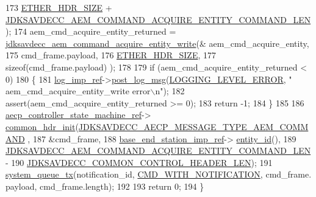 \begin{DoxyCode}
173                                                         \hyperlink{namespaceavdecc__lib_a6c827b1a0d973e18119c5e3da518e65ca9512ad9b34302ba7048d88197e0a2dc0}{ETHER\_HDR\_SIZE} + 
      \hyperlink{group__command__acquire__entity_gacd48c850101d4deef27e5c003f1c54cb}{JDKSAVDECC\_AEM\_COMMAND\_ACQUIRE\_ENTITY\_COMMAND\_LEN});
174     aem\_cmd\_acquire\_entity\_returned = 
      \hyperlink{group__command__acquire__entity_ga8f6285801e4769fe5ed789c57306f264}{jdksavdecc\_aem\_command\_acquire\_entity\_write}(&
      aem\_cmd\_acquire\_entity,
175                                                                                   cmd\_frame.payload,
176                                                                                   
      \hyperlink{namespaceavdecc__lib_a6c827b1a0d973e18119c5e3da518e65ca9512ad9b34302ba7048d88197e0a2dc0}{ETHER\_HDR\_SIZE},
177                                                                                   \textcolor{keyword}{sizeof}(cmd\_frame.payload)
      );
178 
179     \textcolor{keywordflow}{if} (aem\_cmd\_acquire\_entity\_returned < 0)
180     \{
181         \hyperlink{namespaceavdecc__lib_acbe3e2a96ae6524943ca532c87a28529}{log\_imp\_ref}->\hyperlink{classavdecc__lib_1_1log_a68139a6297697e4ccebf36ccfd02e44a}{post\_log\_msg}(\hyperlink{namespaceavdecc__lib_a501055c431e6872ef46f252ad13f85cdaf2c4481208273451a6f5c7bb9770ec8a}{LOGGING\_LEVEL\_ERROR}, \textcolor{stringliteral}{"
      aem\_cmd\_acquire\_entity\_write error\(\backslash\)n"});
182         assert(aem\_cmd\_acquire\_entity\_returned >= 0);
183         \textcolor{keywordflow}{return} -1;
184     \}
185 
186     \hyperlink{namespaceavdecc__lib_a0b1b5aea3c0490f77cbfd9178af5be22}{aecp\_controller\_state\_machine\_ref}->
      \hyperlink{classavdecc__lib_1_1aecp__controller__state__machine_aafc737d7ed17a62fed9df6528f18d3ec}{common\_hdr\_init}(\hyperlink{group__aecp__message__type_ga4625ce189cc209f42deb0629f48faf69}{JDKSAVDECC\_AECP\_MESSAGE\_TYPE\_AEM\_COMMAND}
      ,
187                                                        &cmd\_frame,
188                                                        \hyperlink{classavdecc__lib_1_1descriptor__base__imp_a550c969411f5f3b69f55cc139763d224}{base\_end\_station\_imp\_ref}->
      \hyperlink{classavdecc__lib_1_1end__station__imp_a363b6c9664a0d701def9b17863e20ad3}{entity\_id}(),
189                                                        
      \hyperlink{group__command__acquire__entity_gacd48c850101d4deef27e5c003f1c54cb}{JDKSAVDECC\_AEM\_COMMAND\_ACQUIRE\_ENTITY\_COMMAND\_LEN} -
190                                                            
      \hyperlink{group__jdksavdecc__avtp__common__control__header_gaae84052886fb1bb42f3bc5f85b741dff}{JDKSAVDECC\_COMMON\_CONTROL\_HEADER\_LEN});
191     \hyperlink{namespaceavdecc__lib_a6dd511685627c0865a3442b539a4e8e9}{system\_queue\_tx}(notification\_id, \hyperlink{namespaceavdecc__lib_aabcadff06aa62be0ce47bc0646823604aba48b8a017e06fb240b650cdea965178}{CMD\_WITH\_NOTIFICATION}, cmd\_frame.
      payload, cmd\_frame.length);
192 
193     \textcolor{keywordflow}{return} 0;
194 \}
\end{DoxyCode}


